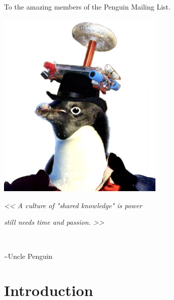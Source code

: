 \documentclass[10pt]{report}
\begin{document}
\setlength{\parskip}{0em}
\renewcommand{\baselinestretch}{0.0}

\newpage


\thispagestyle{empty}
\begin{center}
    
\vspace*{2.5cm}

{\selectfont
To the amazing members of the Penguin Mailing List.
}

\vspace*{3cm}

\includegraphics[width = 80mm]{PML.png}

\vspace*{1cm}

\small
{\selectfont
\textit{<< A culture of "shared knowledge" is power}

\textit{still needs time and passion. >>}

\,\,\,

\textasciitilde Uncle Penguin

}

\vspace*{2cm}

\end{center}

\newpage

\setlength{\parindent}{0cm}
\clearpage

\tableofcontents

\setlength{\parskip}{1em}
\renewcommand{\baselinestretch}{1.0}

\newpage

\chapter{Introduction} \label{chap:intro}
\end{document}
